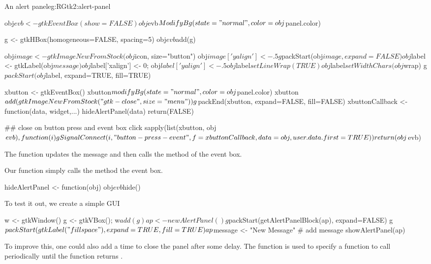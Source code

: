 \begin{example}{An alert panel}{eg:RGtk2:alert-panel}
\begin{Schunk}
\begin{Sinput}
{   obj$evb <- gtkEventBox(show=FALSE)
   obj$evb$ModifyBg(state="normal",color=obj$panel.color)
 
   g <- gtkHBox(homogeneous=FALSE, spacing=5)
   obj$evb$add(g)
 
   obj$image <- gtkImageNewFromStock(obj$icon, size="button")
   obj$image['yalign'] <- .5
   g$packStart(obj$image, expand=FALSE)
 
   obj$label <- gtkLabel(obj$message)
   obj$label['xalign'] <- 0; obj$label['yalign'] <- .5
   obj$label$setLineWrap(TRUE)
   obj$label$setWidthChars(obj$wrap)
   g$packStart(obj$label, expand=TRUE, fill=TRUE)
 
   xbutton <- gtkEventBox()
   xbutton$modifyBg(state="normal", color=obj$panel.color) 
   xbutton$add(gtkImageNewFromStock("gtk-close", size="menu"))
   g$packEnd(xbutton, expand=FALSE, fill=FALSE)
   xbuttonCallback <- function(data, widget,...) {
     hideAlertPanel(data)
     return(FALSE)
   }
 
   ## close on button press and event box click
   sapply(list(xbutton, obj$evb), function(i) {
     gSignalConnect(i, "button-press-event",
                    f=xbuttonCallback,
                    data=obj, user.data.first=TRUE)
     })
   return(obj$evb)
 }
\end{Sinput}
\end{Schunk}

The  function updates the message and then calls
the  method of the event box.

\begin{Schunk}
\end{Schunk}

Our  function simply calls the 
method the event box.
\begin{Schunk}
\begin{Sinput}
 hideAlertPanel <- function(obj) obj$evb$hide()
\end{Sinput}
\end{Schunk}

To test it out, we create a simple GUI
\begin{Schunk}
\begin{Sinput}
 w <- gtkWindow()
 g <- gtkVBox(); w$add(g)
 ap <- newAlertPanel()
 g$packStart(getAlertPanelBlock(ap), expand=FALSE)
 g$packStart(gtkLabel("fill space"), expand=TRUE, fill=TRUE)
 ap$message <- "New Message"             # add message
 showAlertPanel(ap)
\end{Sinput}
\end{Schunk}

To improve this, one could also add a time to close the panel after some delay. The
 function is used to specify a function to call
periodically until the function returns .

\end{example}

